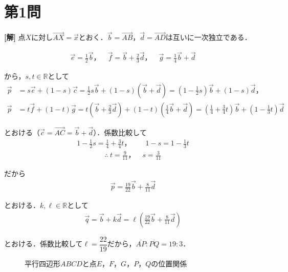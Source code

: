 \documentclass[../main.tex]{subfiles}
\begin{document}
\section*{第1問}

{\bf [解]}
点$X$に対し$\overrightarrow{AX}=\vec{x}$とおく．$\vec b=\overrightarrow{AB}$，$\vec d=\overrightarrow{AD}$は互いに一次独立である．

\begin{align*}
  \vec e=\frac12\vec b，\quad \vec f=\vec b+\frac23\vec d，\quad \vec g=\frac14\vec b+\vec d
\end{align*}

から，$s,t\in\mathbb{R}$として
\begin{align*}
  \vec p&=s\vec e+(1-s)\vec c=\frac12s\vec b+(1-s)(\vec b+\vec d)=\left(1-\frac12s\right)\vec b+(1-s)\vec d，\\
  \vec p&=t\vec f+(1-t)\vec g=t\left(\vec b+\frac23\vec d\right)+(1-t)\left(\frac14\vec b+\vec d\right)=\left(\frac14+\frac34t\right)\vec b+\left(1-\frac13t\right)\vec d
\end{align*}

とおける（$\vec c=\overrightarrow{AC}=\vec b+\vec d$）．係数比較して
\begin{align*}
  1-\frac12s=\frac14+\frac34t，\qquad 1-s=1-\frac13t
\end{align*}
\begin{align*}
  \therefore\ t=\frac{9}{11}，\quad s=\frac{3}{11}
\end{align*}

だから
\begin{align*}
  \vec p=\frac{19}{22}\vec b+\frac{8}{11}\vec d
\end{align*}

とおける．$k,\ell\in\mathbb{R}$として
\begin{align*}
  \vec q=\vec b+k\vec d=\ell\left(\frac{19}{22}\vec b+\frac{8}{11}\vec d\right)
\end{align*}

とおける．係数比較して$\ell=\dfrac{22}{19}$だから，$\overline{AP}:\overline{PQ}=19:3$．

\begin{figure}[htb]
  \centering
  \caption{平行四辺形$ABCD$と点$E$，$F$，$G$，$P$，$Q$の位置関係}
\end{figure}
\end{document}
